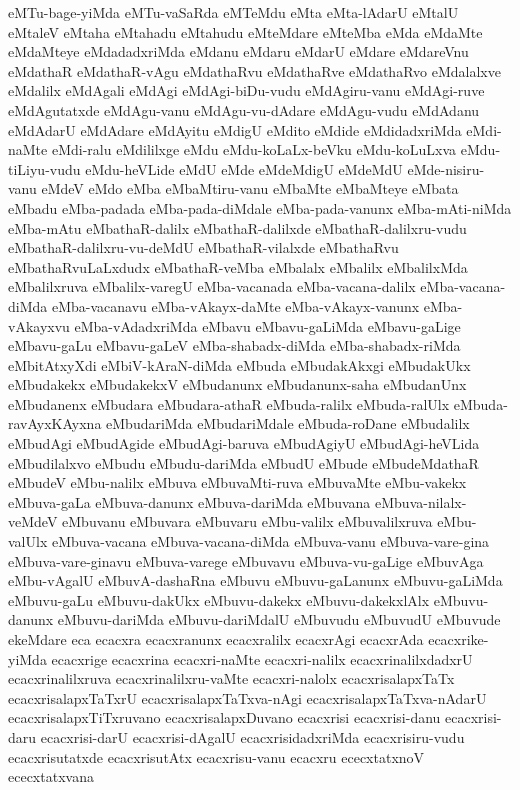 {eMTu-bage-yiMda
eMTu-vaSaRda
eMTeMdu
eMta
eMta-lAdarU
eMtalU
eMtaleV
eMtaha
eMtahadu
eMtahudu
eMteMdare
eMteMba
eMda
eMdaMte
eMdaMteye
eMdadadxriMda
eMdanu
eMdaru
eMdarU
eMdare
eMdareVnu
eMdathaR
eMdathaR-vAgu
eMdathaRvu
eMdathaRve
eMdathaRvo
eMdalalxve
eMdalilx
eMdAgali
eMdAgi
eMdAgi-biDu-vudu
eMdAgiru-vanu
eMdAgi-ruve
eMdAgutatxde
eMdAgu-vanu
eMdAgu-vu-dAdare
eMdAgu-vudu
eMdAdanu
eMdAdarU
eMdAdare
eMdAyitu
eMdigU
eMdito
eMdide
eMdidadxriMda
eMdi-naMte
eMdi-ralu
eMdililxge
eMdu
eMdu-koLaLx-beVku
eMdu-koLuLxva
eMdu-tiLiyu-vudu
eMdu-heVLide
eMdU
eMde
eMdeMdigU
eMdeMdU
eMde-nisiru-vanu
eMdeV
eMdo
eMba
eMbaMtiru-vanu
eMbaMte
eMbaMteye
eMbata
eMbadu
eMba-padada
eMba-pada-diMdale
eMba-pada-vanunx
eMba-mAti-niMda
eMba-mAtu
eMbathaR-dalilx
eMbathaR-dalilxde
eMbathaR-dalilxru-vudu
eMbathaR-dalilxru-vu-deMdU
eMbathaR-vilalxde
eMbathaRvu
eMbathaRvuLaLxdudx
eMbathaR-veMba
eMbalalx
eMbalilx
eMbalilxMda
eMbalilxruva
eMbalilx-varegU
eMba-vacanada
eMba-vacana-dalilx
eMba-vacana-diMda
eMba-vacanavu
eMba-vAkayx-daMte
eMba-vAkayx-vanunx
eMba-vAkayxvu
eMba-vAdadxriMda
eMbavu
eMbavu-gaLiMda
eMbavu-gaLige
eMbavu-gaLu
eMbavu-gaLeV
eMba-shabadx-diMda
eMba-shabadx-riMda
eMbitAtxyXdi
eMbiV-kAraN-diMda
eMbuda
eMbudakAkxgi
eMbudakUkx
eMbudakekx
eMbudakekxV
eMbudanunx
eMbudanunx-saha
eMbudanUnx
eMbudanenx
eMbudara
eMbudara-athaR
eMbuda-ralilx
eMbuda-ralUlx
eMbuda-ravAyxKAyxna
eMbudariMda
eMbudariMdale
eMbuda-roDane
eMbudalilx
eMbudAgi
eMbudAgide
eMbudAgi-baruva
eMbudAgiyU
eMbudAgi-heVLida
eMbudilalxvo
eMbudu
eMbudu-dariMda
eMbudU
eMbude
eMbudeMdathaR
eMbudeV
eMbu-nalilx
eMbuva
eMbuvaMti-ruva
eMbuvaMte
eMbu-vakekx
eMbuva-gaLa
eMbuva-danunx
eMbuva-dariMda
eMbuvana
eMbuva-nilalx-veMdeV
eMbuvanu
eMbuvara
eMbuvaru
eMbu-valilx
eMbuvalilxruva
eMbu-valUlx
eMbuva-vacana
eMbuva-vacana-diMda
eMbuva-vanu
eMbuva-vare-gina
eMbuva-vare-ginavu
eMbuva-varege
eMbuvavu
eMbuva-vu-gaLige
eMbuvAga
eMbu-vAgalU
eMbuvA-dashaRna
eMbuvu
eMbuvu-gaLanunx
eMbuvu-gaLiMda
eMbuvu-gaLu
eMbuvu-dakUkx
eMbuvu-dakekx
eMbuvu-dakekxlAlx
eMbuvu-danunx
eMbuvu-dariMda
eMbuvu-dariMdalU
eMbuvudu
eMbuvudU
eMbuvude
ekeMdare
eca
ecacxra
ecacxranunx
ecacxralilx
ecacxrAgi
ecacxrAda
ecacxrike-yiMda
ecacxrige
ecacxrina
ecacxri-naMte
ecacxri-nalilx
ecacxrinalilxdadxrU
ecacxrinalilxruva
ecacxrinalilxru-vaMte
ecacxri-nalolx
ecacxrisalapxTaTx
ecacxrisalapxTaTxrU
ecacxrisalapxTaTxva-nAgi
ecacxrisalapxTaTxva-nAdarU
ecacxrisalapxTiTxruvano
ecacxrisalapxDuvano
ecacxrisi
ecacxrisi-danu
ecacxrisi-daru
ecacxrisi-darU
ecacxrisi-dAgalU
ecacxrisidadxriMda
ecacxrisiru-vudu
ecacxrisutatxde
ecacxrisutAtx
ecacxrisu-vanu
ecacxru
ececxtatxnoV
ececxtatxvana
}
